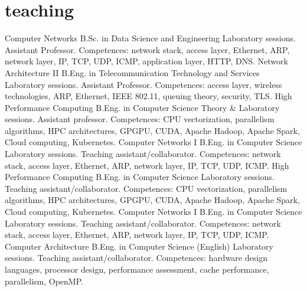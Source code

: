 \documentclass[]{friggeri-cv}
\begin{document}
\section{teaching}
\begin{entrylist}
{Computer Networks}
{B.Sc. in Data Science and Engineering}
{Laboratory sessions. Assistant Professor. Competences: network stack, access layer, Ethernet, ARP, network layer, IP, TCP, UDP, ICMP, application layer, HTTP, DNS. 
}
{Network Architecture II}
{B.Eng. in Telecommunication Technology and Services}
{Laboratory sessions. Assistant Professor. Competences: access layer, wireless technologies, ARP, Ethernet, IEEE 802.11, queuing theory, security, TLS. %
}
{High Performance Computing}
{B.Eng. in Computer Science}
{Theory \& Laboratory sessions. Assistant professor. Competences: CPU vectorization, parallelism algorithms, HPC architectures, GPGPU, CUDA, Apache Hadoop, Apache Spark, Cloud computing, Kubernetes. 
}
{Computer Networks I}
{B.Eng. in Computer Science}
{Laboratory sessions. Teaching assistant/collaborator. Competences: network stack, access layer, Ethernet, ARP, network layer, IP, TCP, UDP, ICMP. 
}
{High Performance Computing}
{B.Eng. in Computer Science}
{Laboratory sessions. Teaching assistant/collaborator. Competences: CPU vectorization, parallelism algorithms, HPC architectures, GPGPU, CUDA, Apache Hadoop, Apache Spark, Cloud computing, Kubernetes. 
}
{Computer Networks I}
{B.Eng. in Computer Science}
{Laboratory sessions. Teaching assistant/collaborator. Competences: network stack, access layer, Ethernet, ARP, network layer, IP, TCP, UDP, ICMP. %
}
{Computer Architecture}
{B.Eng. in Computer Science (English)}
{Laboratory sessions. Teaching assistant/collaborator. Competences: hardware design languages, processor design, performance assessment, cache performance, parallelism, OpenMP. %
}
\end{entrylist}
\end{document}
